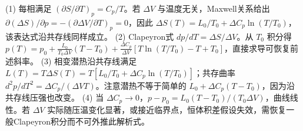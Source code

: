 (1) 每相满足 \((\partial S/\partial T)_p=C_p/T\)。若 \(\Delta V\) 与温度无关，Maxwell关系给出 \(\partial(\Delta S)/\partial p=-(\partial\Delta V/\partial T)_p=0\)，因此 \(\Delta S(T)=L_0/T_0+\Delta C_p\ln(T/T_0)\)，该表达式沿共存线同样成立。
(2) Clapeyron式 \(dp/dT=\Delta S/\Delta V\)。从 \(T_0\) 积分得 \(p(T)=p_0+\frac{L_0}{T_0\Delta V}(T-T_0)+\frac{\Delta C_p}{\Delta V}[T\ln(T/T_0)-T+T_0]\)，直接求导可恢复前述斜率。
(3) 相变潜热沿共存线满足 \(L(T)=T\Delta S(T)=T[L_0/T_0+\Delta C_p\ln(T/T_0)]\)；共存曲率 \(d^2p/dT^2=\Delta C_p/(\Delta VT)\)。注意潜热不等于简单的 \(L_0+\Delta C_p(T-T_0)\)，因为沿共存线压强也改变。
(4) 当 \(\Delta C_p\to0\)，\(p-p_0=L_0(T-T_0)/(T_0\Delta V)\)，曲线线性。若 \(\Delta V\) 实际随压温变化显著，或接近临界点，恒体积差假设失效，需恢复一般Clapeyron积分而不可外推此解析式。
